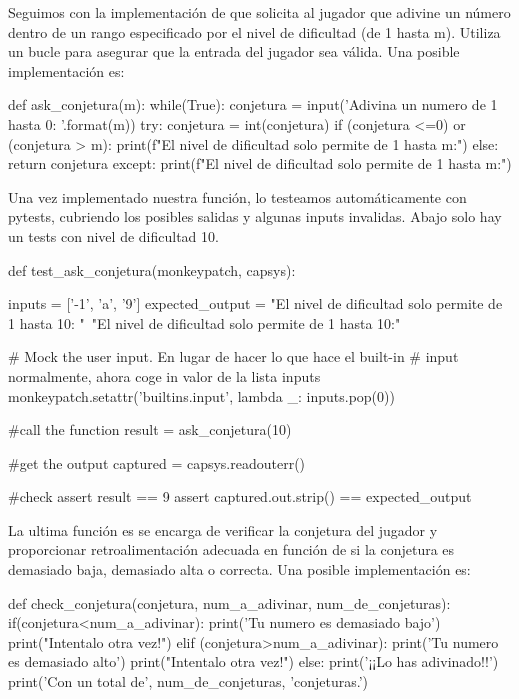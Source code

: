 Seguimos con la implementación de  que solicita al jugador que adivine un número dentro de un rango especificado por el nivel de dificultad (de 1 hasta m). Utiliza un bucle para asegurar que la entrada del jugador sea válida. Una posible implementación es:

\begin{python}
def ask_conjetura(m):
    while(True):
        conjetura = input('Adivina un numero de 1 hasta {0}: '.format(m))
        try:
            conjetura = int(conjetura)
            if (conjetura <=0) or (conjetura > m):
                print(f"El nivel de dificultad solo permite de 1 hasta {m}:")
            else:
                return conjetura
        except:
            print(f"El nivel de dificultad solo permite de 1 hasta {m}:")
\end{python}

Una vez implementado nuestra función, lo testeamos automáticamente con pytests, cubriendo los posibles salidas y algunas inputs invalidas. Abajo solo hay un tests con nivel de dificultad 10.

\begin{python}
def test_ask_conjetura(monkeypatch, capsys):
    
    inputs = ['-1', 'a', '9'] 
    expected_output = "El nivel de dificultad solo permite de 1 hasta 10: \n"\
                      "El nivel de dificultad solo permite de 1 hasta 10:"
    
    # Mock the user input. En lugar de hacer lo que hace el built-in
    # input normalmente, ahora coge in valor de la lista inputs
    monkeypatch.setattr('builtins.input', lambda _: inputs.pop(0))
    
    #call the function
    result = ask_conjetura(10)
    
    #get the output
    captured = capsys.readouterr()
    
    #check
    assert result == 9
    assert captured.out.strip() == expected_output
\end{python}

La ultima función es  se encarga de verificar la conjetura del jugador y proporcionar retroalimentación adecuada en función de si la conjetura es demasiado baja, demasiado alta o correcta. Una posible implementación es:

\begin{python}
def check_conjetura(conjetura, num_a_adivinar, num_de_conjeturas):
    if(conjetura<num_a_adivinar):
        print('Tu numero es demasiado bajo')
        print("Intentalo otra vez!")
    elif (conjetura>num_a_adivinar):
        print('Tu numero es demasiado alto')
        print("Intentalo otra vez!")
    else:
        print('¡¡Lo has adivinado!!')
        print('Con un total de', num_de_conjeturas, 'conjeturas.')
\end{python}


